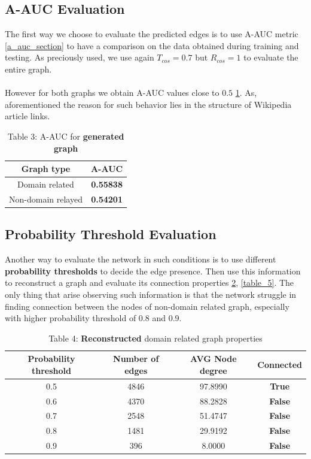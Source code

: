 \documentclass[11pt]{article}
\begin{document}
	\subsection{A-AUC Evaluation}
	The first way we choose to evaluate the predicted edges is to use A-AUC metric \ref{a_auc_section} to have a comparison on the data obtained during training and testing.
	As preciously used, we use again $T_{cos}=0.7$ but $R_{cos}=1$ to evaluate the entire graph.\\\\
	However for both graphs we obtain A-AUC values close to $0.5$ \ref{table_3}. As, aforementioned the reason for such behavior lies in the structure of Wikipedia article links.
	
	\begin{table}[h!]
		\centering
		\begin{tabular}{cc}
			\toprule
			Graph type & \textbf{A-AUC} \\
			\midrule
			Domain related & \textbf{0.55838} \\
			Non-domain relayed & \textbf{0.54201} \\
			\bottomrule
		\end{tabular}
		\caption{Table 3: A-AUC for \textbf{generated graph}}
		\label{table_3}
	\end{table}
	
	\subsection{Probability Threshold Evaluation}
	Another way to evaluate the network in such conditions is to use different \textbf{probability thresholds} to decide the edge presence. Then use this information to reconstruct a graph and evaluate its connection properties \ref{table_4}, \ref{table_5}.
	The only thing that arise observing such information is that the network struggle in finding connection between the nodes of non-domain related graph, especially with higher probability threshold of $0.8$ and $0.9$.   
	
	\begin{table}[h!]
		\centering
		\begin{tabular}{cccc}
			\toprule
			Probability threshold & Number of edges & AVG \textbf{Node degree} & \textbf{Connected} \\
			\midrule
			0.5 & 4846 & 97.8990 & \textbf{True}\\
			0.6 & 4370 & 88.2828 & \textbf{False} \\
			0.7 & 2548 & 51.4747 &  \textbf{False} \\
			0.8 & 1481 & 29.9192 & \textbf{False} \\
			0.9 & 396  & 8.0000 & \textbf{False} \\
			\bottomrule
		\end{tabular}
		\caption{Table 4: \textbf{Reconstructed} domain related graph properties}
		\label{table_4}
	\end{table}
	
\end{document}
